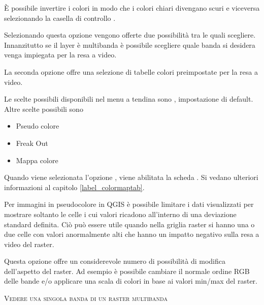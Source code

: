 È possibile invertire i colori in modo che i colori chiari divengano scuri e
viceversa selezionando la casella di controllo .


Selezionando questa opzione vengono offerte due possibilità tra le quali
scegliere. Innanzitutto se il layer è multibanda è possibile scegliere quale
banda si desidera venga impiegata per la resa a video. 

La seconda opzione offre una selezione di tabelle colori preimpostate per la
resa a video.

Le scelte possibili disponibili nel menu a tendina sono
, impostazione di default.
Altre scelte possibili sono
\begin{itemize}
\item Pseudo colore
\item Freak Out
\item Mappa colore
\end{itemize}

Quando viene selezionata l'opzione ,
viene abilitata la scheda . Si vedano ulteriori
informazioni al capitolo \ref{label_colormaptab}.

Per immagini in pseudocolore in QGIS è possibile limitare i dati visualizzati
per mostrare soltanto le celle i cui valori ricadono all'interno di una deviazione standard
definita. Ciò può essere utile quando
nella griglia raster si hanno una o due celle con valori anormalmente alti
che hanno un impatto negativo sulla resa a video del raster.


Questa opzione offre un considerevole numero di possibilità di modifica
dell'aspetto del raster. Ad esempio è possibile cambiare il normale ordine RGB
delle bande e/o applicare una scala di colori in base ai valori min/max del
raster.

\begin{Tip}\caption{\textsc{Vedere una singola banda di un raster multibanda}}
\end{Tip} 

